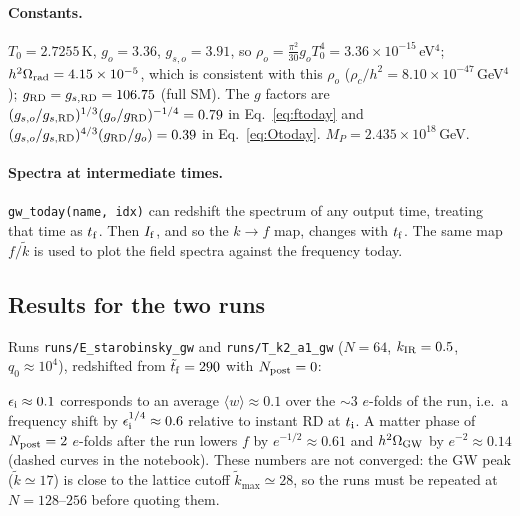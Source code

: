 \documentclass[11pt,a4paper]{article}
\newcommand{\MP}{M_P}
\newcommand{\file}[1]{\texttt{#1}}
\begin{document}
\paragraph{Constants.} $T_0=2.7255$\,K, $g_o=3.36$, $g_{s,o}=3.91$, so $\rho_o=\frac{\pi^2}{30}g_oT_0^4=3.36\times10^{-15}$\,eV$^4$; $h^2\Omega_{\rm rad}=4.15\times10^{-5}$, which is consistent with this $\rho_o$ ($\rho_c/h^2=8.10\times10^{-47}$\,GeV$^4$); $g_{\rm RD}=g_{s,\rm RD}=106.75$ (full SM). The $g$ factors are $(g_{s,o}/g_{s,\rm RD})^{1/3}(g_o/g_{\rm RD})^{-1/4}=0.79$ in Eq.~\eqref{eq:ftoday} and $(g_{s,o}/g_{s,\rm RD})^{4/3}(g_{\rm RD}/g_o)=0.39$ in Eq.~\eqref{eq:Otoday}. $\MP=2.435\times10^{18}$\,GeV.

\paragraph{Spectra at intermediate times.} \texttt{gw\_today(name, idx)} can redshift the spectrum of any output time, treating that time as $t_{\rm f}$. Then $I_{\rm f}$, and so the $k\to f$ map, changes with $t_{\rm f}$. The same map $f/\tilde k$ is used to plot the field spectra against the frequency today.

\subsection{Results for the two runs}
Runs \file{runs/E\_starobinsky\_gw} and \file{runs/T\_k2\_a1\_gw} ($N=64$, $k_{\rm IR}=0.5$, $q_0\approx10^4$), redshifted from $\tilde t_{\rm f}=290$ with $N_{\rm post}=0$:
\begin{center}
\renewcommand{\arraystretch}{1.15}
\end{center}
$\epsilon_{\rm i}\approx0.1$ corresponds to an average $\langle w\rangle\approx0.1$ over the $\sim3$ $e$-folds of the run, i.e.\ a frequency shift by $\epsilon_{\rm i}^{1/4}\approx0.6$ relative to instant RD at $t_{\rm i}$. A matter phase of $N_{\rm post}=2$ $e$-folds after the run lowers $f$ by $e^{-1/2}\approx0.61$ and $h^2\Omega_{\rm GW}$ by $e^{-2}\approx0.14$ (dashed curves in the notebook). These numbers are not converged: the GW peak ($\tilde k\simeq17$) is close to the lattice cutoff $\tilde k_{\max}\simeq28$, so the runs must be repeated at $N=128$--$256$ before quoting them.
\end{document}
